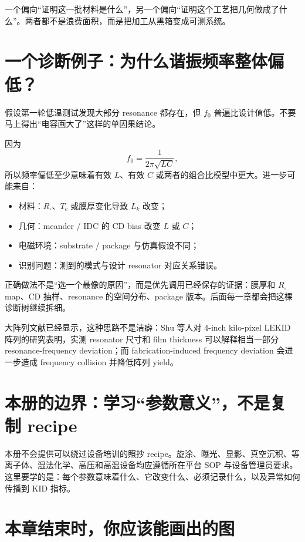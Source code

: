 一个偏向“证明这一批材料是什么”，另一个偏向“证明这个工艺把几何做成了什么”。两者都不是浪费面积，而是把加工从黑箱变成可测系统。

\section{一个诊断例子：为什么谐振频率整体偏低？}

假设第一轮低温测试发现大部分 resonance 都存在，但 $f_0$ 普遍比设计值低。不要马上得出“电容画大了”这样的单因果结论。

因为
\[
f_0=\frac{1}{2\pi\sqrt{LC}},
\]
所以频率偏低至少意味着有效 $L$、有效 $C$ 或两者的组合比模型中更大。进一步可能来自：

\begin{itemize}
  \item 材料：$R_\square$、$T_c$ 或膜厚变化导致 $L_k$ 改变；
  \item 几何：meander / IDC 的 CD bias 改变 $L$ 或 $C$；
  \item 电磁环境：substrate / package 与仿真假设不同；
  \item 识别问题：测到的模式与设计 resonator 对应关系错误。
\end{itemize}

正确做法不是“选一个最像的原因”，而是优先调用已经保存的证据：膜厚和 $R_\square$ map、CD 抽样、resonance 的空间分布、package 版本。后面每一章都会把这棵诊断树继续拆细。

大阵列文献已经显示，这种思路不是洁癖：Shu 等人对 4-inch kilo-pixel LEKID 阵列的研究表明，实测 resonator 尺寸和 film thickness 可以解释相当一部分 resonance-frequency deviation；而 fabrication-induced frequency deviation 会进一步造成 frequency collision 并降低阵列 yield。

\section{本册的边界：学习“参数意义”，不是复制 recipe}

\begin{warningbox}
本册不会提供可以绕过设备培训的照抄 recipe。旋涂、曝光、显影、真空沉积、等离子体、湿法化学、高压和高温设备均应遵循所在平台 SOP 与设备管理员要求。这里要学的是：每个参数意味着什么、它改变什么、必须记录什么，以及异常如何传播到 KID 指标。
\end{warningbox}

\section{本章结束时，你应该能画出的图}

